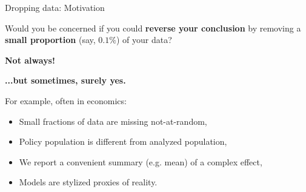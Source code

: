 \begin{frame}{Dropping data: Motivation}

Would you be concerned if you could \textbf{reverse your conclusion} by removing
a \textbf{small proportion} (say, $0.1\%$) of your data?

\pause
\textbf{Not always!}


\pause
\textbf{...but sometimes, surely yes.}

For example, often in economics:
%
\begin{itemize}
\item Small fractions of data are missing not-at-random,
\item Policy population is different from analyzed population,
\item We report a convenient summary (e.g. mean) of a complex effect,
\item Models are stylized proxies of reality.
\end{itemize}


\end{frame}



